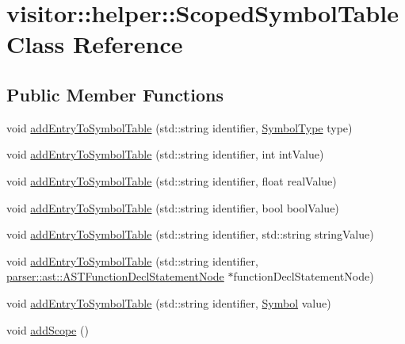 \hypertarget{classvisitor_1_1helper_1_1ScopedSymbolTable}{}\section{visitor\+:\+:helper\+:\+:Scoped\+Symbol\+Table Class Reference}
\label{classvisitor_1_1helper_1_1ScopedSymbolTable}
\subsection*{Public Member Functions}
\begin{DoxyCompactItemize}
\item 
void \hyperlink{classvisitor_1_1helper_1_1ScopedSymbolTable_afa14e4f8f1b71fe6961120f55c20c50c}{add\+Entry\+To\+Symbol\+Table} (std\+::string identifier, \hyperlink{ASTVariableDeclStatementNode_8h_a1e8e1bde0729627e3a22ffa858d5f3b9}{Symbol\+Type} type)
\item 
void \hyperlink{classvisitor_1_1helper_1_1ScopedSymbolTable_afc5afd4fe70ae4556e512db38c9c257b}{add\+Entry\+To\+Symbol\+Table} (std\+::string identifier, int int\+Value)
\item 
void \hyperlink{classvisitor_1_1helper_1_1ScopedSymbolTable_a8297b38007e89b53bb8286b7afd23d37}{add\+Entry\+To\+Symbol\+Table} (std\+::string identifier, float real\+Value)
\item 
void \hyperlink{classvisitor_1_1helper_1_1ScopedSymbolTable_a4161155b0e73f398bb816a92895f5099}{add\+Entry\+To\+Symbol\+Table} (std\+::string identifier, bool bool\+Value)
\item 
void \hyperlink{classvisitor_1_1helper_1_1ScopedSymbolTable_ad9531010cb89b1fc09e4850894c957a2}{add\+Entry\+To\+Symbol\+Table} (std\+::string identifier, std\+::string string\+Value)
\item 
void \hyperlink{classvisitor_1_1helper_1_1ScopedSymbolTable_a7bd90ed126440e1110882ef00b8095ce}{add\+Entry\+To\+Symbol\+Table} (std\+::string identifier, \hyperlink{classparser_1_1ast_1_1ASTFunctionDeclStatementNode}{parser\+::ast\+::\+A\+S\+T\+Function\+Decl\+Statement\+Node} $\ast$function\+Decl\+Statement\+Node)
\item 
void \hyperlink{classvisitor_1_1helper_1_1ScopedSymbolTable_a7b1027f36d0682ea440d48230f7ec62a}{add\+Entry\+To\+Symbol\+Table} (std\+::string identifier, \hyperlink{structvisitor_1_1helper_1_1Symbol}{Symbol} value)
\item 
void \hyperlink{classvisitor_1_1helper_1_1ScopedSymbolTable_a4938e3fb5c563484363538994a080be8}{add\+Scope} ()

\end{DoxyCompactItemize}
